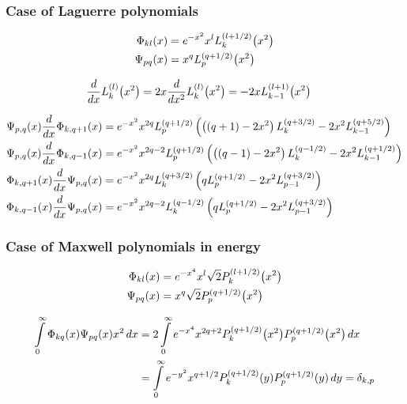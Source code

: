 \documentclass{article}[draft]
\begin{document}
\subsubsection{Case of Laguerre polynomials}
\begin{align*}
\Phi_{kl}\of{x} &= e^{-x^2} x^l \lagp{l+1/2}{k}\of{x^2} \\
\Psi_{pq}\of{x} &= x^q \lagp{q+1/2}{p}\of{x^2} 
\end{align*}

\begin{align*}
\frac{d}{dx} \lagp{l}{k} \of{x^2} 
&= 2 x \frac{d}{dx^2} \lagp{l}{k}\of{x^2} = - 2 x \lagp{l+1}{k-1}\of{x^2}
\end{align*}

\begin{align*}
\Psi_{p,q}\of{x} \frac{d}{dx} \Phi_{k,q+1}\of{x} 
&= e^{-x^2} x^{2q} \lagp{q+1/2}{p} 
\left( \left( (q+1) - 2x^2 \right) \lagp{q+3/2}{k} - 2x^2 \lagp{q+5/2}{k-1} \right)
\\
\Psi_{p,q}\of{x} \frac{d}{dx} \Phi_{k,q-1}\of{x} 
&= 
e^{-x^2} x^{2q-2} \lagp{q+1/2}{p} 
\left( \left( (q-1) - 2x^2 \right) \lagp{q-1/2}{k} - 2x^2 \lagp{q+1/2}{k-1} \right)
\\
\Phi_{k,q+1}\of{x} \frac{d}{dx} \Psi_{p,q}\of{x}
&= e^{-x^2} x^{2q} \lagp{q+3/2}{k} 
\left( q \lagp{q+1/2}{p} - 2x^2 \lagp{q+3/2}{p-1} \right)
\\
\Phi_{k,q-1}\of{x} \frac{d}{dx} \Psi_{p,q}\of{x}
&= e^{-x^2} x^{2q-2} \lagp{q-1/2}{k}
\left( q \lagp{q+1/2}{p} - 2x^2 \lagp{q+3/2}{p-1} \right)
\end{align*}



\subsubsection{Case of Maxwell polynomials in energy}

\begin{align*}
\Phi_{kl}\of{x} &= e^{-x^4} x^l \sqrt{2} \maxp{l+1/2}{k}\of{x^2} \\
\Psi_{pq}\of{x} &= x^q \sqrt{2} \maxp{q+1/2}{p}\of{x^2} 
\end{align*}

\begin{align*}
\myint_0^\infty \Phi_{kq}\of{x} \Psi_{pq}\of{x} x^2 \diff{x} 
&= 2 \myint_0^\infty e^{-x^4} x^{2q+2}\maxp{q+1/2}{k}\of{x^2} \maxp{q+1/2}{p}\of{x^2} \diff{x} 
\\
&= \myint_0^\infty e^{-y^2} x^{q+1/2}\maxp{q+1/2}{k}\of{y} \maxp{q+1/2}{p}\of{y} \diff{y}
= \delta_{k,p}
\end{align*}
\end{document}
